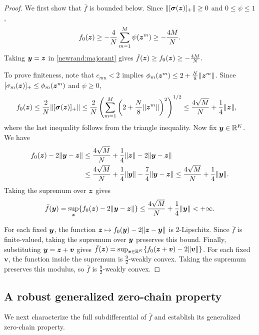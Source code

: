 \begin{proof}
We first show that $\bar f$ is bounded below.
Since $\|[\boldsymbol\sigma(\bm{z})]_+\|\ge0$ and
$0\le\psi\le1$,
\begin{equation}
 f_0(\bm{z})
 \ge-\frac4N\sum_{m=1}^M\psi(\bm{z}^m)
 \ge-\frac{4M}{N}.
 \label{eq:lower_f}
\end{equation}
Taking $\bm{y}=\bm{z}$ in \eqref{newrand:majorant} gives
$
 \bar f(\bm{z})\ge f_0(\bm{z})\ge-\tfrac{4M}{N}.
$ 

To prove finiteness, note that $c_{mn}<2$ implies
$\phi_m(\bm{z}^m)\le2+\tfrac{N}{8}\|\bm{z}^m\|$.
Since $[\sigma_m(\bm{z})]_+\le\phi_m(\bm{z}^m)$ and $\psi\ge0$,
\begin{align*}
 f_0(\bm{z})
 &\le\frac2N\|[\boldsymbol\sigma(\bm{z})]_+\|\le\frac2N
 \left(\sum_{m=1}^M
 \left(2+\frac N8\|\bm{z}^m\|\right)^2\right)^{1/2}\le\frac{4\sqrt M}{N}+\frac14\|\bm{z}\|,
\end{align*}
where the last inequality follows from the triangle
inequality. 
Now fix $\bm{y}\in{\mathbb{R}}^K$. We have 
\begin{equation}
\label{eq:f0_coer}
\begin{aligned}
 f_0(\bm{z})-2\|\bm{y}-\bm{z}\|
 &\le\frac{4\sqrt M}{N}
       +\frac14\|\bm{z}\|-2\|\bm{y}-\bm{z}\|\\
 &\le\frac{4\sqrt M}{N}
       +\frac14\|\bm{y}\|-\frac74\|\bm{y}-\bm{z}\|\le\frac{4\sqrt M}{N}+\frac14\|\bm{y}\|.
\end{aligned}
\end{equation}
Taking the supremum over $\bm{z}$ gives
\[
 \bar f(\bm{y})
 =\sup_{\bm{z}}\{f_0(\bm{z})-2\|\bm{y}-\bm{z}\|\}
 \le\frac{4\sqrt M}{N}+\frac14\|\bm{y}\|
 <+\infty.
\]

For each fixed $\bm{y}$, the function
$\bm{z}\mapsto f_0(\bm{y})-2\|\bm{z}-\bm{y}\|$ is $2$-Lipschitz.
Since $\bar f$ is finite-valued, taking the supremum over
$\bm{y}$ preserves this bound.
Finally, substituting $\bm{y}=\bm{z}+\bm v$ gives
$\bar f(\bm{z})=\sup_{\bm v\in{\mathbb{R}}^K}
\{f_0(\bm{z}+\bm v)-2\|\bm v\|\}$.
For each fixed $\bm v$, the function inside the supremum
is $\tfrac92$-weakly convex.
Taking the supremum preserves this modulus, so
$\bar f$ is $\tfrac92$-weakly convex.
\end{proof}
\subsection{A robust generalized zero-chain property} 
\label{sec:locality} 
We next characterize the full subdifferential of $\bar f$
and establish its generalized zero-chain property. 


